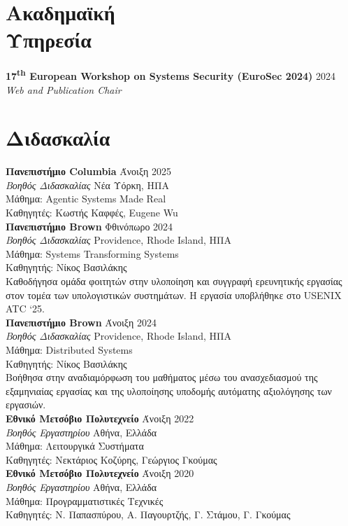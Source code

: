 \documentclass[margin, 10pt]{resume}
\newcommand{\sectionVSpace}{\vspace{-3.5ex}} %
\newcommand{\institution}[1]{\textbf{#1}\xspace}
\newcommand{\ordinal}[1]{\textsuperscript{#1}\xspace}
\newcommand{\rSection}[1]{\sectionVSpace\section{#1}\xspace}
\newcommand{\role}[1]{\textit{#1}\xspace}
\newcommand{\service}[1]{\textbf{#1}\xspace}
\newcommand{\stitle}[1]{#1:\xspace}
\begin{document}
\begin{resume}
    \rSection{Ακαδημαϊκή\\Υπηρεσία}

    \service{17\ordinal{th} European Workshop on Systems Security (EuroSec 2024)} \hfill 2024 \\
    \role{Web and Publication Chair} \\

    \rSection{Διδασκαλία}

    \institution{Πανεπιστήμιο Columbia} \hfill Άνοιξη 2025 \\
    \role{Βοηθός Διδασκαλίας} \hfill Νέα Υόρκη, ΗΠΑ \\
    \stitle{Μάθημα} Agentic Systems Made Real \\
    \stitle{Καθηγητές} Κωστής Καφφές, Eugene Wu \\

    \institution{Πανεπιστήμιο Brown} \hfill Φθινόπωρο 2024 \\
    \role{Βοηθός Διδασκαλίας} \hfill Providence, Rhode Island, ΗΠΑ \\
    \stitle{Μάθημα} Systems Transforming Systems \\
    \stitle{Καθηγητής} Νίκος Βασιλάκης \\
    Καθοδήγησα ομάδα φοιτητών στην υλοποίηση και συγγραφή ερευνητικής εργασίας στον τομέα των υπολογιστικών συστημάτων. Η εργασία υποβλήθηκε στο USENIX ATC `25. \\

    \institution{Πανεπιστήμιο Brown} \hfill Άνοιξη 2024 \\
    \role{Βοηθός Διδασκαλίας} \hfill Providence, Rhode Island, ΗΠΑ \\
    \stitle{Μάθημα} Distributed Systems \\
    \stitle{Καθηγητής} Νίκος Βασιλάκης \\
    Βοήθησα στην αναδιαμόρφωση του μαθήματος μέσω του ανασχεδιασμού της εξαμηνιαίας εργασίας και της υλοποίησης υποδομής αυτόματης αξιολόγησης των εργασιών. \\

    \institution{Εθνικό Μετσόβιο Πολυτεχνείο} \hfill Άνοιξη 2022 \\
    \role{Βοηθός Εργαστηρίου} \hfill Αθήνα, Ελλάδα \\
    \stitle{Μάθημα} Λειτουργικά Συστήματα \\
    \stitle{Καθηγητές} Νεκτάριος Κοζύρης, Γεώργιος Γκούμας \\

    \institution{Εθνικό Μετσόβιο Πολυτεχνείο} \hfill Άνοιξη 2020 \\
    \role{Βοηθός Εργαστηρίου} \hfill Αθήνα, Ελλάδα \\
    \stitle{Μάθημα} Προγραμματιστικές Τεχνικές \\
    \stitle{Καθηγητές} Ν. Παπασπύρου, Α. Παγουρτζής, Γ. Στάμου, Γ. Γκούμας \\


\end{resume}
\end{document}
